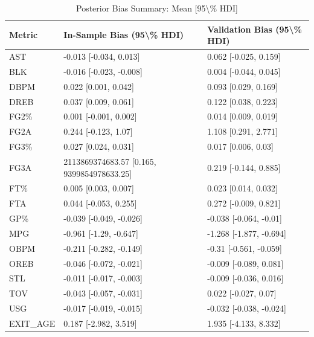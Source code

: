 \begin{table}[t]
\caption*{
{\fontsize{20}{25}\selectfont  Posterior Bias Summary: Mean [95\textbackslash{}\% HDI]\fontsize{12}{15}\selectfont }
} 
\fontsize{12.0pt}{14.0pt}\selectfont
\begin{tabular*}{\linewidth}{@{\extracolsep{\fill}}lll}
\toprule
Metric & In-Sample Bias (95\textbackslash{}\% HDI) & Validation Bias (95\textbackslash{}\% HDI) \\ 
\midrule\addlinespace[2.5pt]
AST & -0.013 [-0.034, 0.013] & 0.062 [-0.025, 0.159] \\ 
BLK & -0.016 [-0.023, -0.008] & 0.004 [-0.044, 0.045] \\ 
DBPM & 0.022 [0.001, 0.042] & 0.093 [0.029, 0.169] \\ 
DREB & 0.037 [0.009, 0.061] & 0.122 [0.038, 0.223] \\ 
FG2\% & 0.001 [-0.001, 0.002] & 0.014 [0.009, 0.019] \\ 
FG2A & 0.244 [-0.123, 1.07] & 1.108 [0.291, 2.771] \\ 
FG3\% & 0.027 [0.024, 0.031] & 0.017 [0.006, 0.03] \\ 
FG3A & 2113869374683.57 [0.165, 9399854978633.25] & 0.219 [-0.144, 0.885] \\ 
FT\% & 0.005 [0.003, 0.007] & 0.023 [0.014, 0.032] \\ 
FTA & 0.044 [-0.053, 0.255] & 0.272 [-0.009, 0.821] \\ 
GP\% & -0.039 [-0.049, -0.026] & -0.038 [-0.064, -0.01] \\ 
MPG & -0.961 [-1.29, -0.647] & -1.268 [-1.877, -0.694] \\ 
OBPM & -0.211 [-0.282, -0.149] & -0.31 [-0.561, -0.059] \\ 
OREB & -0.046 [-0.072, -0.021] & -0.009 [-0.089, 0.081] \\ 
STL & -0.011 [-0.017, -0.003] & -0.009 [-0.036, 0.016] \\ 
TOV & -0.043 [-0.057, -0.031] & 0.022 [-0.027, 0.07] \\ 
USG & -0.017 [-0.019, -0.015] & -0.032 [-0.038, -0.024] \\ 
EXIT\_AGE & 0.187 [-2.982, 3.519] & 1.935 [-4.133, 8.332] \\ 
\bottomrule
\end{tabular*}
\end{table}

